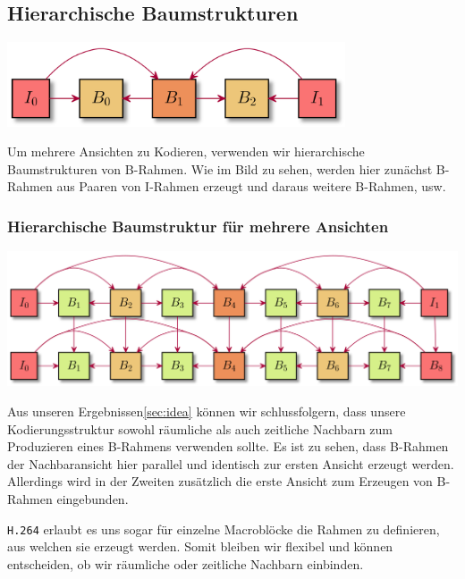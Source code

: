 \subsection{Hierarchische Baumstrukturen}\label{subsec:htrees}

\begin{center}
    \includegraphics[width=0.75\textwidth]{../img/b-pictures}
\end{center}

\noindent Um mehrere Ansichten zu Kodieren, verwenden wir hierarchische Baumstrukturen\cite{hier-b-frames} von B-Rahmen.
Wie im Bild zu sehen, werden hier zun\"achst B-Rahmen aus Paaren von I-Rahmen erzeugt und daraus weitere B-Rahmen, usw.


\subsubsection{Hierarchische Baumstruktur f\"ur mehrere Ansichten}
\begin{center}
    \includegraphics[width=1\textwidth]{../img/b-pictures-3d}
\end{center}
Aus unseren Ergebnissen\ref{sec:idea} k\"onnen wir schlussfolgern, dass unsere Kodierungsstruktur sowohl r\"aumliche als
auch zeitliche Nachbarn zum Produzieren eines B-Rahmens verwenden sollte.
Es ist zu sehen, dass B-Rahmen der Nachbaransicht hier parallel und identisch zur ersten Ansicht erzeugt werden.
Allerdings wird in der Zweiten zus\"atzlich die erste Ansicht zum Erzeugen von B-Rahmen eingebunden.

\noindent\newline \texttt{H.264} erlaubt es uns sogar f\"ur einzelne Macrobl\"ocke die Rahmen zu definieren\cite{h264},
aus welchen sie erzeugt werden.
Somit bleiben wir flexibel und k\"onnen entscheiden, ob wir r\"aumliche oder zeitliche Nachbarn einbinden.
